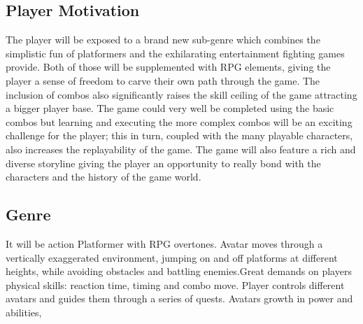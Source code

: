 \documentclass{article}
\begin{document}
\subsection*{Player Motivation}
The player will be exposed to a brand new sub-genre which combines the simplistic fun of platformers and the exhilarating entertainment fighting games provide. Both of those will be supplemented with RPG elements, giving the player a sense of freedom to carve their own path through the game. The inclusion of combos also significantly raises the skill ceiling of the game attracting a bigger player base. The game could very well be completed using the basic combos but learning and executing the more complex combos will be an exciting challenge for the player; this in turn, coupled with the many playable characters, also increases the replayability of the game. The game will also feature a rich and diverse storyline giving the player an opportunity to really bond with the characters and the history of the game world. 

\subsection*{Genre}
It will be action Platformer with RPG overtones. Avatar moves through a vertically exaggerated environment, jumping on and off platforms at different heights, while avoiding obstacles and battling enemies.Great demands on players physical skills: reaction time, timing and combo move.
Player controls different avatars and guides them through a series of quests. Avatars growth in power and abilities,
\end{document}
